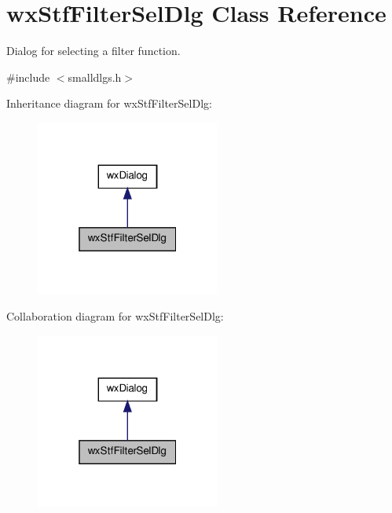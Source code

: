 \hypertarget{classwxStfFilterSelDlg}{
\section{wxStfFilterSelDlg Class Reference}
\label{classwxStfFilterSelDlg}
}


Dialog for selecting a filter function.  




{\ttfamily \#include $<$smalldlgs.h$>$}



Inheritance diagram for wxStfFilterSelDlg:
\nopagebreak
\begin{figure}[H]
\begin{center}
\leavevmode
\includegraphics[width=172pt]{classwxStfFilterSelDlg__inherit__graph}
\end{center}
\end{figure}


Collaboration diagram for wxStfFilterSelDlg:
\nopagebreak
\begin{figure}[H]
\begin{center}
\leavevmode
\includegraphics[width=172pt]{classwxStfFilterSelDlg__coll__graph}
\end{center}
\end{figure}

